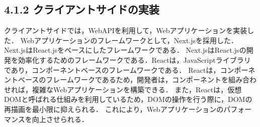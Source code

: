 

\subsection*{4.1.2 クライアントサイドの実装}
クライアントサイドでは，WebAPIを利用して，Webアプリケーションを実装した．
Webアプリケーションのフレームワークとして，Next.jsを採用した．Next.jsはReact.jsをベースにしたフレームワークである．
Next.jsはReact.jsの開発を効率化するためのフレームワークである．Reactは，JavaScriptライブラリであり，コンポーネントベースのフレームワークである．
Reactは，コンポーネントベースのフレームワークであるため，開発者は，コンポーネントを組み合わせれば，複雑なWebアプリケーションを構築できる．
また，Reactは，仮想DOMと呼ばれる仕組みを利用しているため，DOMの操作を行う際に，DOMの再描画を最小限に抑えられる．
これにより，Webアプリケーションのパフォーマンスを向上させられる．





